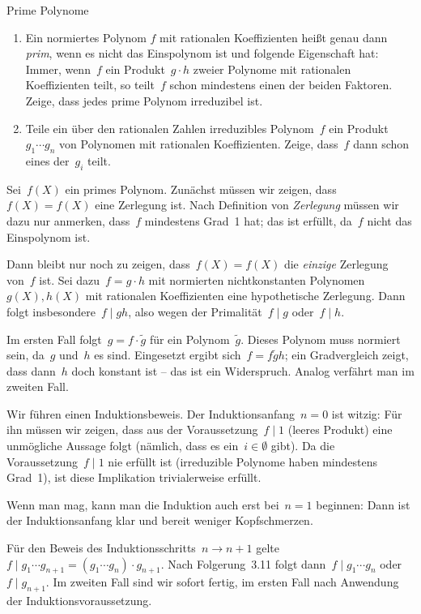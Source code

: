 \documentclass{algblatt}
\begin{document}
\ifloesungen\newpage\fi
\begin{aufgabe}{Prime Polynome}
\begin{enumerate}
\item Ein normiertes Polynom $f$ mit rationalen Koeffizienten heißt
genau dann \emph{prim}, wenn es nicht das Einspolynom ist und folgende
Eigenschaft hat: Immer, wenn~$f$ ein
Produkt~$g \cdot h$ zweier Polynome mit
rationalen Koeffizienten teilt, so teilt~$f$ schon mindestens einen der
beiden Faktoren. Zeige, dass jedes prime Polynom irreduzibel ist.
\item Teile ein über den rationalen Zahlen irreduzibles Polynom~$f$ ein
Produkt~$g_1 \cdots g_n$ von Polynomen mit rationalen Koeffizienten.
Zeige, dass~$f$ dann schon eines der~$g_i$ teilt.
\end{enumerate}

\begin{loesungE}
\item Sei~$f(X)$ ein primes Polynom. Zunächst müssen wir zeigen, dass~$f(X) =
f(X)$ eine Zerlegung ist. Nach Definition von \emph{Zerlegung} müssen wir dazu
nur anmerken, dass~$f$ mindestens Grad~1 hat; das ist erfüllt, da~$f$ nicht das
Einspolynom ist.

Dann bleibt nur noch zu zeigen, dass~$f(X) = f(X)$
die \emph{einzige} Zerlegung von~$f$ ist. Sei dazu~$f = g \cdot h$ mit
normierten nichtkonstanten Polynomen~$g(X), h(X)$ mit rationalen Koeffizienten
eine hypothetische Zerlegung.
Dann folgt insbesondere~$f \mid gh$, also wegen der Primalität~$f \mid g$ oder~$f
\mid h$.

Im ersten Fall folgt~$g = f \cdot \widetilde g$ für ein
Polynom~$\widetilde g$. Dieses Polynom muss normiert sein, da~$g$ und~$h$ es
sind. Eingesetzt ergibt sich~$f = f \widetilde g h$; ein Gradvergleich zeigt,
dass dann~$h$ doch konstant ist -- das ist ein Widerspruch. Analog verfährt man
im zweiten Fall.

\item Wir führen einen Induktionsbeweis. Der Induktionsanfang~$n = 0$ ist
witzig: Für ihn müssen wir zeigen, dass aus der Voraussetzung~$f \mid 1$
(leeres Produkt) eine unmögliche Aussage folgt (nämlich, dass es ein~$i \in
\emptyset$ gibt). Da die Voraussetzung~$f \mid 1$ nie erfüllt ist (irreduzible
Polynome haben mindestens Grad~1), ist diese Implikation trivialerweise
erfüllt.

Wenn man mag, kann man die Induktion auch erst bei~$n = 1$ beginnen: Dann ist
der Induktionsanfang klar und bereit weniger Kopfschmerzen.

Für den Beweis des Induktionsschritts~$n \to n + 1$ gelte~$f \mid g_1 \cdots
g_{n+1} = (g_1 \cdots g_n) \cdot g_{n+1}$. Nach Folgerung~3.11 folgt dann~$f
\mid g_1 \cdots g_n$ oder~$f \mid g_{n+1}$. Im zweiten Fall sind wir sofort
fertig, im ersten Fall nach Anwendung der Induktionsvoraussetzung.
\end{loesungE}
\end{aufgabe}
\end{document}
